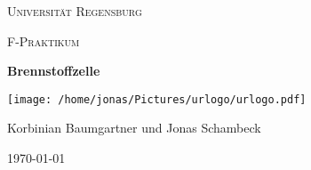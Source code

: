 \begin{titlepage}
	\centering
	{\scshape \LARGE Universität Regensburg \par}
	\vspace{1cm}
	{\scshape\Large F-Praktikum\par}
	\vspace{1.5cm}
	{\huge\bfseries Brennstoffzelle\par}
	\vspace{2cm}
	\texttt{[image: /home/jonas/Pictures/urlogo/urlogo.pdf]}\par
	\vfill
	{\large Korbinian Baumgartner und Jonas Schambeck\par}
	
	\vfill

	{\large \today\par}
\end{titlepage}

